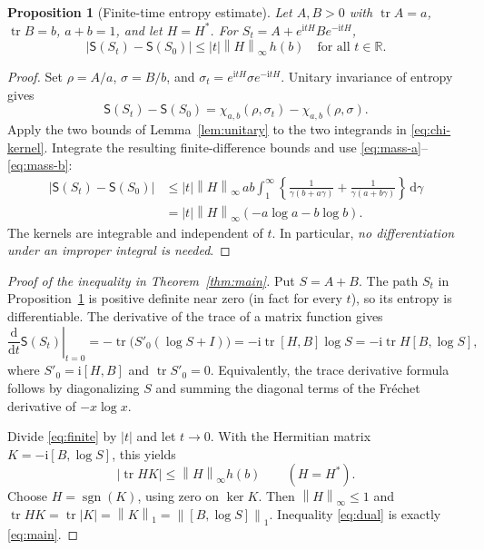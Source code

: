 \documentclass[11pt]{article}
\numberwithin{equation}{section}
\newtheorem{proposition}[theorem]{Proposition}
\theoremstyle{remark}
\DeclareMathOperator{\tr}{tr}
\DeclareMathOperator{\sgn}{sgn}
\newcommand{\Id}{I}
\newcommand{\one}[1]{\left\lVert #1\right\rVert_1}
\newcommand{\op}[1]{\left\lVert #1\right\rVert_\infty}
\newcommand{\ent}{\mathsf S}
\newcommand{\dd}{\,\mathrm d}
\newcommand{\ii}{\mathrm i}
\begin{document}
\begin{proposition}[Finite-time entropy estimate]
\label{prop:finite}
Let $A,B>0$ with $\tr A=a$, $\tr B=b$, $a+b=1$, and let $H=H^*$.
For $S_t=A+e^{\ii tH}Be^{-\ii tH}$,
\begin{equation}
 |\ent(S_t)-\ent(S_0)|\le |t|\op{H}\,h(b)
 \quad\text{for all }t\in\mathbb R.
 \label{eq:finite}
\end{equation}
\end{proposition}
\begin{proof}
Set $\rho=A/a$, $\sigma=B/b$, and $\sigma_t=e^{\ii tH}\sigma e^{-\ii tH}$.
Unitary invariance of entropy gives
\[
 \ent(S_t)-\ent(S_0)
  =\chi_{a,b}(\rho,\sigma_t)-\chi_{a,b}(\rho,\sigma).
\]
Apply the two bounds of Lemma~\ref{lem:unitary} to the two integrands in
\eqref{eq:chi-kernel}. Integrate the resulting finite-difference bounds
and use \eqref{eq:mass-a}--\eqref{eq:mass-b}:
\begin{align*}
 |\ent(S_t)-\ent(S_0)|
 &\le |t|\op{H}\,ab\int_1^\infty
 \left\{\frac1{\gamma(b+a\gamma)}
          +\frac1{\gamma(a+b\gamma)}\right\}\dd\gamma\\
 &=|t|\op{H}(-a\log a-b\log b).
\end{align*}
The kernels are integrable and independent of $t$. In particular,
\emph{no differentiation under an improper integral is needed}.
\end{proof}

\begin{proof}[Proof of the inequality in Theorem~\ref{thm:main}]
Put $S=A+B$. The path $S_t$ in Proposition~\ref{prop:finite} is positive
definite near zero (in fact for every $t$), so its entropy is
differentiable. The derivative of the trace of a matrix function gives
\[
 \left.\frac{\mathrm d}{\mathrm dt}\ent(S_t)\right|_{t=0}
 =-\tr\bigl(S'_0(\log S+\Id)\bigr)
 =-\ii\tr[H,B]\log S
 =-\ii\tr H[B,\log S],
\]
where $S'_0=\ii[H,B]$ and $\tr S'_0=0$. Equivalently, the trace derivative
formula follows by diagonalizing $S$ and summing the diagonal terms of
the Fr\'echet derivative of $-x\log x$.

Divide \eqref{eq:finite} by $|t|$ and let $t\to0$. With the Hermitian
matrix $K=-\ii[B,\log S]$, this yields
\begin{equation}
 |\tr HK|\le\op{H}h(b)\qquad(H=H^*).
 \label{eq:dual}
\end{equation}
Choose $H=\sgn(K)$, using zero on $\ker K$. Then $\op{H}\le1$ and
$\tr HK=\tr|K|=\one{K}=\one{[B,\log S]}$. Inequality
\eqref{eq:dual} is exactly \eqref{eq:main}.
\end{proof}
\end{document}
